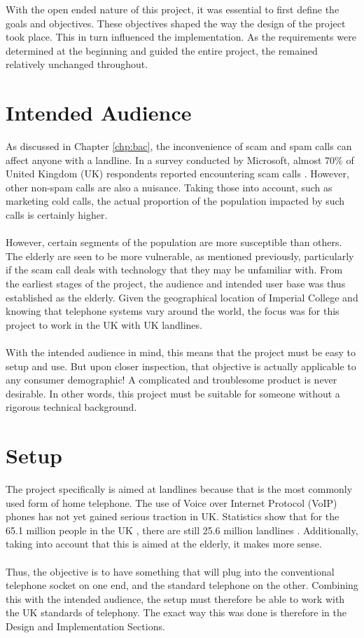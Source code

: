 \documentclass[main.tex]{subfiles}
\begin{document}
With the open ended nature of this project, it was essential to first define the goals and objectives. These objectives shaped the way the design of the project took place. This in turn influenced the implementation. As the requirements were determined at the beginning and guided the entire project, the remained relatively unchanged throughout.

\section{Intended Audience}
As discussed in Chapter \ref{chp:bac}, the inconvenience of scam and spam calls can affect anyone with a landline. In a survey conducted by Microsoft, almost 70\% of United Kingdom (UK) respondents reported encountering scam calls \cite{microsoft-survey}. However, other non-spam calls are also a nuisance. Taking those into account, such as marketing cold calls, the actual proportion of the population impacted by such calls is certainly higher.
\\\\
However, certain segments of the population are more susceptible than others. The elderly are seen to be more vulnerable, as mentioned previously, particularly if the scam call deals with technology that they may be unfamiliar with. From the earliest stages of the project, the audience and intended user base was thus established as the elderly. Given the geographical location of Imperial College and knowing that telephone systems vary around the world, the focus was for this project to work in the UK with UK landlines.
\\\\
With the intended audience in mind, this means that the project must be easy to setup and use. But upon closer inspection, that objective is actually applicable to any consumer demographic! A complicated and troublesome product is never desirable. In other words, this project must be suitable for someone without a rigorous technical background.

\section{Setup}
The project specifically is aimed at landlines because that is the most commonly used form of home telephone. The use of Voice over Internet Protocol (VoIP) phones has not yet gained serious traction in UK. Statistics show that for the 65.1 million people in the UK \cite{ons}, there are still 25.6 million landlines \cite{ofcom}. Additionally, taking into account that this is aimed at the elderly, it makes more sense.
\\\\
Thus, the objective is to have something that will plug into the conventional telephone socket on one end, and the standard telephone on the other. Combining this with the intended audience, the setup must therefore be able to work with the UK standards of telephony. The exact way this was done is therefore in the Design and Implementation Sections.
\end{document}
